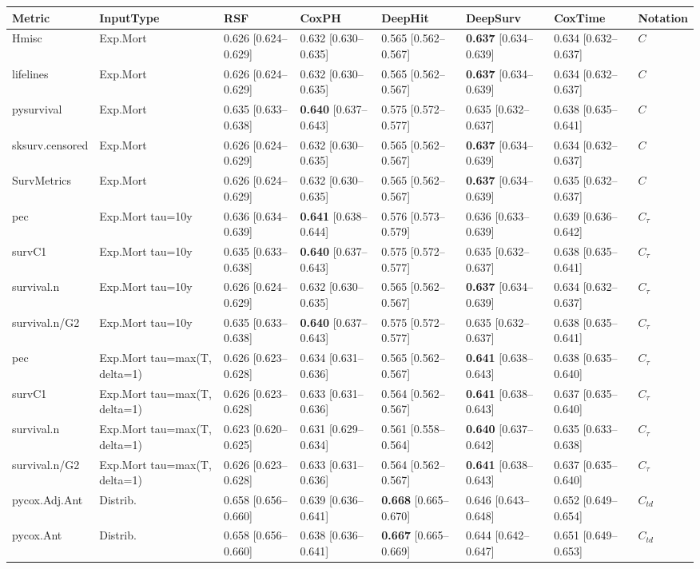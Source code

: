 
\begin{tabular}{llllllll}
\toprule
Metric & InputType & RSF & CoxPH & DeepHit & DeepSurv & CoxTime & Notation\\
\midrule
Hmisc & Exp.Mort & 0.626 [0.624–0.629] & 0.632 [0.630–0.635] & 0.565 [0.562–0.567] & \textbf{0.637} [0.634–0.639] & 0.634 [0.632–0.637] & $C$\\
lifelines & Exp.Mort & 0.626 [0.624–0.629] & 0.632 [0.630–0.635] & 0.565 [0.562–0.567] & \textbf{0.637} [0.634–0.639] & 0.634 [0.632–0.637] & $C$\\
pysurvival & Exp.Mort & 0.635 [0.633–0.638] & \textbf{0.640} [0.637–0.643] & 0.575 [0.572–0.577] & 0.635 [0.632–0.637] & 0.638 [0.635–0.641] & $C$\\
sksurv.censored & Exp.Mort & 0.626 [0.624–0.629] & 0.632 [0.630–0.635] & 0.565 [0.562–0.567] & \textbf{0.637} [0.634–0.639] & 0.634 [0.632–0.637] & $C$\\
SurvMetrics & Exp.Mort & 0.626 [0.624–0.629] & 0.632 [0.630–0.635] & 0.565 [0.562–0.567] & \textbf{0.637} [0.634–0.639] & 0.635 [0.632–0.637] & $C$\\
\addlinespace
pec & Exp.Mort tau=10y & 0.636 [0.634–0.639] & \textbf{0.641} [0.638–0.644] & 0.576 [0.573–0.579] & 0.636 [0.633–0.639] & 0.639 [0.636–0.642] & $C_{\tau}$\\
survC1 & Exp.Mort tau=10y & 0.635 [0.633–0.638] & \textbf{0.640} [0.637–0.643] & 0.575 [0.572–0.577] & 0.635 [0.632–0.637] & 0.638 [0.635–0.641] & $C_{\tau}$\\
survival.n & Exp.Mort tau=10y & 0.626 [0.624–0.629] & 0.632 [0.630–0.635] & 0.565 [0.562–0.567] & \textbf{0.637} [0.634–0.639] & 0.634 [0.632–0.637] & $C_{\tau}$\\
survival.n/G2 & Exp.Mort tau=10y & 0.635 [0.633–0.638] & \textbf{0.640} [0.637–0.643] & 0.575 [0.572–0.577] & 0.635 [0.632–0.637] & 0.638 [0.635–0.641] & $C_{\tau}$\\
pec & Exp.Mort tau=max(T, delta=1) & 0.626 [0.623–0.628] & 0.634 [0.631–0.636] & 0.565 [0.562–0.567] & \textbf{0.641} [0.638–0.643] & 0.638 [0.635–0.640] & $C_{\tau}$\\
\addlinespace
survC1 & Exp.Mort tau=max(T, delta=1) & 0.626 [0.623–0.628] & 0.633 [0.631–0.636] & 0.564 [0.562–0.567] & \textbf{0.641} [0.638–0.643] & 0.637 [0.635–0.640] & $C_{\tau}$\\
survival.n & Exp.Mort tau=max(T, delta=1) & 0.623 [0.620–0.625] & 0.631 [0.629–0.634] & 0.561 [0.558–0.564] & \textbf{0.640} [0.637–0.642] & 0.635 [0.633–0.638] & $C_{\tau}$\\
survival.n/G2 & Exp.Mort tau=max(T, delta=1) & 0.626 [0.623–0.628] & 0.633 [0.631–0.636] & 0.564 [0.562–0.567] & \textbf{0.641} [0.638–0.643] & 0.637 [0.635–0.640] & $C_{\tau}$\\
pycox.Adj.Ant & Distrib. & 0.658 [0.656–0.660] & 0.639 [0.636–0.641] & \textbf{0.668} [0.665–0.670] & 0.646 [0.643–0.648] & 0.652 [0.649–0.654] & $C_{td}$\\
pycox.Ant & Distrib. & 0.658 [0.656–0.660] & 0.638 [0.636–0.641] & \textbf{0.667} [0.665–0.669] & 0.644 [0.642–0.647] & 0.651 [0.649–0.653] & $C_{td}$\\
\bottomrule
\end{tabular}
